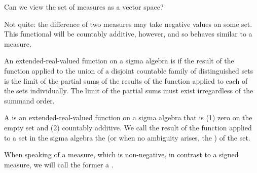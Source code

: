 
\sbasic




































\sstart
{}


Can we view the set of
measures as a vector space?

Not quite:
the difference of two measures
may take negative values
on some set.
This functional
will be countably
additive, however, and
so behaves similar to a measure.


An extended-real-valued
function on a
sigma algebra is
if the result of the function applied to
the union of a disjoint countable family of
distinguished sets is the limit of the partial
sums of the results of the function applied
to each of the sets individually.
The limit of the partial sums must
exist irregardless of the summand order.

A
is an extended-real-valued
function on a
sigma algebra that is
(1) zero on the empty set and
(2) countably additive.
We call the result of the function
applied to a set in the sigma
algebra the
(or when no ambiguity arises, the
)
of the set.

When speaking of a measure,
which is non-negative,
in contrast to a signed measure,
we will call the former a
.

